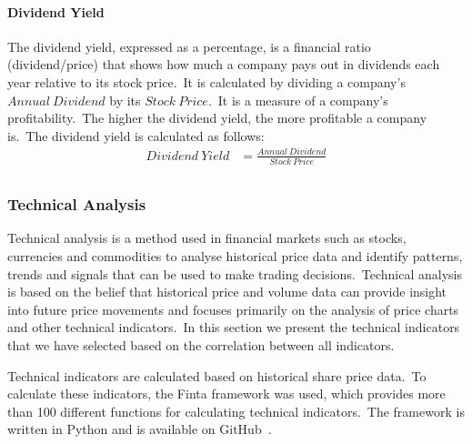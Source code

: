 \documentclass[../xlapes02]{subfiles}
\begin{document}
    \paragraph{Dividend Yield}\label{par:dividend-yield}
    The dividend yield, expressed as a percentage, is a financial ratio (dividend/price) that shows how much a company pays out in dividends each year relative to its stock price.\ It is calculated by dividing a company's $Annual\ Dividend$ by its $Stock\ Price$.\ It is a measure of a company's profitability.\ The higher the dividend yield, the more profitable a company is.\ The dividend yield is calculated as follows:
    \begin{equation}
        \label{eq:dividend-yield}
        \begin{split}
            Dividend\ Yield&=\frac{Annual\ Dividend}{Stock\ Price}\\
        \end{split}
    \end{equation}

    \subsubsection{Technical Analysis}\label{subsubsec:technical-analysis}
    Technical analysis is a method used in financial markets such as stocks, currencies and commodities to analyse historical price data and identify patterns, trends and signals that can be used to make trading decisions.\ Technical analysis is based on the belief that historical price and volume data can provide insight into future price movements and focuses primarily on the analysis of price charts and other technical indicators.\ In this section we present the technical indicators that we have selected based on the correlation between all indicators.


    Technical indicators are calculated based on historical share price data.\ To calculate these indicators, the Finta framework was used, which provides more than 100 different functions for calculating technical indicators.\ The framework is written in Python and is available on GitHub~\cite{finta}.
\end{document}
